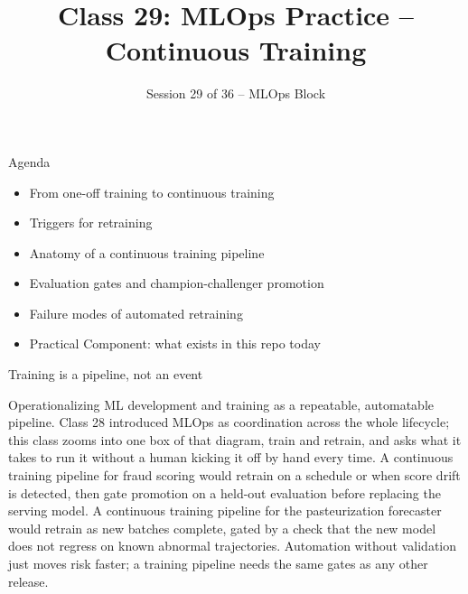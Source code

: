 

\title{Class 29: MLOps Practice -- Continuous Training}
\subtitle{Session 29 of 36 -- MLOps Block}
\author{\coursename}
\date{}



\frame{\titlepage \coursefooter}

\begin{frame}{Agenda}
\begin{itemize}
\item From one-off training to continuous training
\item Triggers for retraining
\item Anatomy of a continuous training pipeline
\item Evaluation gates and champion-challenger promotion
\item Failure modes of automated retraining
\item Practical Component: what exists in this repo today
\end{itemize}
\coursefooter
\end{frame}

\begin{frame}{Training is a pipeline, not an event}
\coursefooter
\end{frame}

\coursecontextframe
{Operationalizing ML development and training as a repeatable, automatable pipeline.}
{Class 28 introduced MLOps as coordination across the whole lifecycle; this class zooms into one box of that diagram, train and retrain, and asks what it takes to run it without a human kicking it off by hand every time.}
{A continuous training pipeline for fraud scoring would retrain on a schedule or when score drift is detected, then gate promotion on a held-out evaluation before replacing the serving model.}
{A continuous training pipeline for the pasteurization forecaster would retrain as new batches complete, gated by a check that the new model does not regress on known abnormal trajectories.}
{Automation without validation just moves risk faster; a training pipeline needs the same gates as any other release.}

